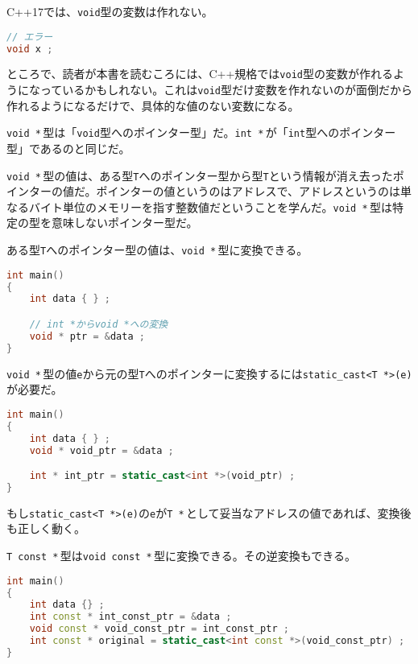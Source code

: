 C++17では、\texttt{void}型の変数は作れない。

\begin{lstlisting}[language={C++}]
// エラー
void x ;
\end{lstlisting}

ところで、読者が本書を読むころには、C++規格では\texttt{void}型の変数が作れるようになっているかもしれない。これは\texttt{void}型だけ変数を作れないのが面倒だから作れるようになるだけで、具体的な値のない変数になる。


\texttt{void *}\,型は「\texttt{void}型へのポインター型」だ。\texttt{int *}\,が「\texttt{int}型へのポインター型」であるのと同じだ。

\texttt{void *}\,型の値は、ある型\texttt{T}へのポインター型から型\texttt{T}という情報が消え去ったポインターの値だ。ポインターの値というのはアドレスで、アドレスというのは単なるバイト単位のメモリーを指す整数値だということを学んだ。\texttt{void *}\,型は特定の型を意味しないポインター型だ。

ある型\texttt{T}へのポインター型の値は、\texttt{void *}\,型に変換できる。

\begin{lstlisting}[language={C++}]
int main()
{
    int data { } ;

    // int *からvoid *への変換
    void * ptr = &data ;
}
\end{lstlisting}

\texttt{void *}\,型の値\texttt{e}から元の型\texttt{T}へのポインターに変換するには\texttt{static\_cast<T *>(e)}が必要だ。

\begin{lstlisting}[language={C++}]
int main()
{
    int data { } ;
    void * void_ptr = &data ;

    int * int_ptr = static_cast<int *>(void_ptr) ;
}
\end{lstlisting}

もし\texttt{static\_cast<T *>(e)}の\texttt{e}が\texttt{T *}\,として妥当なアドレスの値であれば、変換後も正しく動く。

\texttt{T const *}\,型は\texttt{void const *}\,型に変換できる。その逆変換もできる。

\begin{lstlisting}[language={C++}]
int main()
{
    int data {} ;
    int const * int_const_ptr = &data ;
    void const * void_const_ptr = int_const_ptr ;
    int const * original = static_cast<int const *>(void_const_ptr) ;
}
\end{lstlisting}

